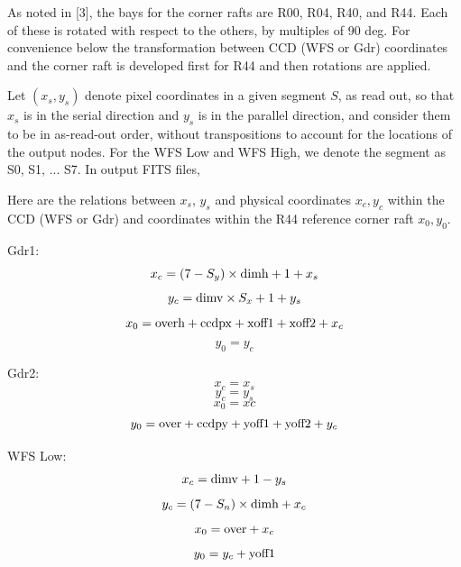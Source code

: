 \documentclass{article}[12pt]
\newcommand{\red}{\textcolor{red}}
\begin{document}
{%

As noted in [3], the bays for the corner rafts are R00, R04, R40, and R44.  Each of these is rotated with respect to the others, by multiples of 90 deg.  For convenience below the transformation between CCD (WFS or Gdr) coordinates and the corner raft is developed first for R44 and then rotations are applied.

Let $(x_s, y_s)$ denote pixel coordinates in a given segment $S$, as read out, so that $x_s$ is in the serial direction and $y_s$ is in the parallel direction, and consider them to be in as-read-out order, without transpositions to account for the locations of the output nodes.  For the WFS Low and WFS High, we denote the segment as S0, S1, ... S7.  In output FITS files, 

Here are the relations between $x_s$, $y_s$ and physical coordinates $x_c, y_c$ within the CCD (WFS or Gdr) and coordinates within the R44 reference corner raft $x_0, y_0$.

Gdr1:
\begin{equation}
x_c = (7 - S_y) \times {\rm dimh} + 1 + x_s
\end{equation}
\begin{equation}
y_c = {\rm dimv} \times S_x + 1 + y_s
\end{equation}
\begin{equation}
x_0 = {\rm overh} + {\rm ccdpx} + {\rm xoff1} + {\rm xoff2} + x_c
\end{equation}
\begin{equation}
y_0 = y_c
\end{equation}

Gdr2:
\begin{equation}
x_c = x_s
\end{equation}
\begin{equation}
y_c = y_s
\end{equation}
\begin{equation}
x_0 = xc
\end{equation}
\begin{equation}
y_0 = {\rm over} + {\rm ccdpy} + {\rm yoff1} + {\rm yoff2} + y_c
\end{equation}

WFS Low:
\begin{equation}
x_c = {\rm dimv} + 1 - y_s
\end{equation}
\begin{equation}
y_c = (7 - S_n) \times {\rm dimh} + x_c
\end{equation}
\begin{equation}
x_0 = {\rm over} + x_c 
\end{equation}
\begin{equation}
y_0 = y_c + {\rm yoff1}
\end{equation}

}
\end{document}
